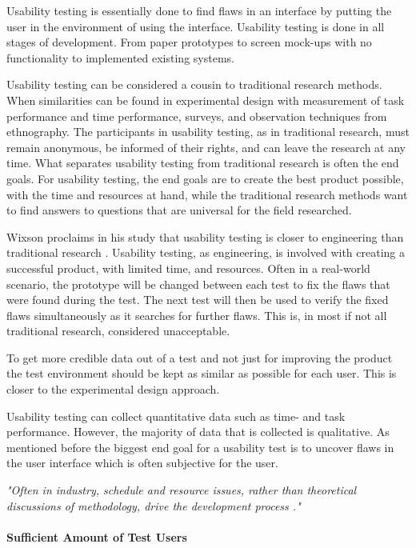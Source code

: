 Usability testing is essentially done to find flaws in an interface by putting the user in the environment of using the interface. Usability testing is done in all stages of development. From paper prototypes to screen mock-ups with no functionality to implemented existing systems. 

Usability testing can be considered a cousin to traditional research methods. When similarities can be found in experimental design with measurement of task performance and time performance, surveys, and observation techniques from ethnography. The participants in usability testing, as in traditional research, must remain anonymous, be informed of their rights, and can leave the research at any time. 
What separates usability testing from traditional research is often the end goals. For usability testing, the end goals are to create the best product possible, with the time and resources at hand, while the traditional research methods want to find answers to questions that are universal for the field researched. 

Wixson proclaims in his study that usability testing is closer to engineering than traditional research \cite{wixon2003evaluating}. Usability testing, as engineering, is involved with creating a successful product, with limited time, and resources. Often in a real-world scenario, the prototype will be changed between each test to fix the flaws that were found during the test. The next test will then be used to verify the fixed flaws simultaneously as it searches for further flaws. This is, in most if not all traditional research, considered unacceptable. 

To get more credible data out of a test and not just for improving the product the test environment should be kept as similar as possible for each user. This is closer to the experimental design approach. 

Usability testing can collect quantitative data such as time- and task performance. However, the majority of data that is collected is qualitative. As mentioned before the biggest end goal for a usability test is to uncover flaws in the user interface which is often subjective for the user.

\textit{"Often in industry, schedule and resource issues, rather than theoretical discussions of methodology, drive the development process \cite{wixon2003evaluating}."}

\paragraph{Sufficient Amount of Test Users}
\label{ssub:Sufficient Amount of Test Users}

